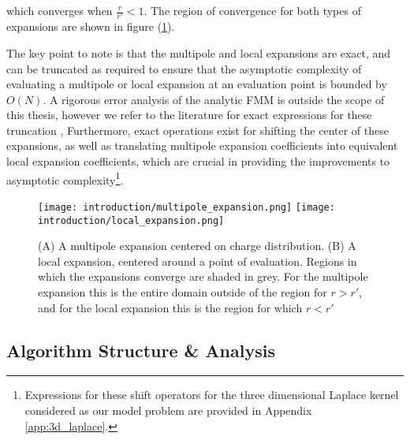 which converges when $\frac{r}{r'} < 1$. The region of convergence for both types
of expansions are shown in figure (\ref{fig:1_1_multipole_local_expansions}).

The key point to note is that the multipole and local expansions are exact, and
can be truncated as required to ensure that the asymptotic complexity of evaluating
a multipole or local expansion at an evaluation point is bounded by $O(N)$. A
rigorous error analysis of the analytic FMM is outside the scope of this thesis, however
we refer to the literature for exact expressions for these truncation \cite{Greengard:1987:Yale},
Furthermore, exact operations exist for shifting the center of these expansions,
as well as translating multipole expansion coefficients into equivalent local expansion
coefficients,
which are crucial in providing the improvements to asymptotic complexity\footnote{
    Expressions for these shift operators for the three dimensional Laplace kernel
    considered as our model problem are provided in Appendix \ref{app:3d_laplace}.
}.

\begin{figure}[!h]
    \centering
    {\texttt{[image: introduction/multipole\_expansion.png]}}
    \hfill
  {\texttt{[image: introduction/local\_expansion.png]}}
  \vspace{0pt}
  \caption{(A) A multipole expansion centered on charge distribution. (B) A local
  expansion, centered around a point of evaluation. Regions in which the expansions
  converge are shaded in grey. For the multipole expansion this is the entire domain
  outside of the region for $r>r'$, and for the local expansion this is the region
  for which $r < r'$}

  \label{fig:1_1_multipole_local_expansions}
\end{figure}

\hspace{10pt}

\subsection{Algorithm Structure \& Analysis}

